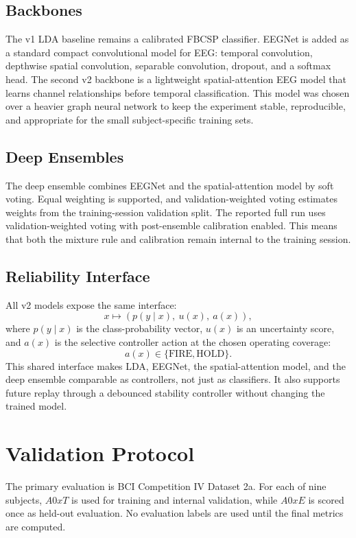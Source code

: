 \documentclass[11pt]{article}
\begin{document}
\subsection{Backbones}

The v1 LDA baseline remains a calibrated FBCSP classifier. EEGNet is added as
a standard compact convolutional model for EEG: temporal convolution,
depthwise spatial convolution, separable convolution, dropout, and a softmax
head. The second v2 backbone is a lightweight spatial-attention EEG model that
learns channel relationships before temporal classification. This model was
chosen over a heavier graph neural network to keep the experiment stable,
reproducible, and appropriate for the small subject-specific training sets.

\subsection{Deep Ensembles}

The deep ensemble combines EEGNet and the spatial-attention model by soft
voting. Equal weighting is supported, and validation-weighted voting estimates
weights from the training-session validation split. The reported full run uses
validation-weighted voting with post-ensemble calibration enabled. This means
that both the mixture rule and calibration remain internal to the training
session.

\subsection{Reliability Interface}

All v2 models expose the same interface:
\[
  x \mapsto \left(p(y \mid x),\ u(x),\ a(x)\right),
\]
where \(p(y \mid x)\) is the class-probability vector, \(u(x)\) is an
uncertainty score, and \(a(x)\) is the selective controller action at the
chosen operating coverage:
\[
  a(x) \in \{\mathrm{FIRE},\mathrm{HOLD}\}.
\]
This shared interface makes LDA, EEGNet, the spatial-attention model, and the
deep ensemble comparable as controllers, not just as classifiers. It also
supports future replay through a debounced stability controller without
changing the trained model.

\section{Validation Protocol}

The primary evaluation is BCI Competition IV Dataset 2a. For each of nine
subjects, \(A0xT\) is used for training and internal validation, while \(A0xE\)
is scored once as held-out evaluation. No evaluation labels are used until the
final metrics are computed.
\end{document}
